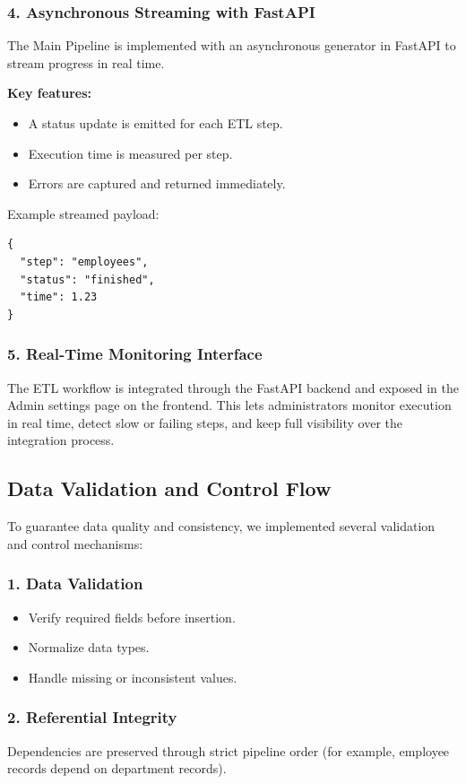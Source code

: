 \subsubsection*{4. Asynchronous Streaming with FastAPI}
The Main Pipeline is implemented with an asynchronous generator in FastAPI to stream progress in real time.

\textbf{Key features:}
\begin{itemize}[noitemsep]
    \item A status update is emitted for each ETL step.
    \item Execution time is measured per step.
    \item Errors are captured and returned immediately.
\end{itemize}

Example streamed payload:
\begin{verbatim}
{
  "step": "employees",
  "status": "finished",
  "time": 1.23
}
\end{verbatim}

\subsubsection*{5. Real-Time Monitoring Interface}
The ETL workflow is integrated through the FastAPI backend and exposed in the Admin settings page on the frontend. This lets administrators monitor execution in real time, detect slow or failing steps, and keep full visibility over the integration process.

\subsection{Data Validation and Control Flow}
To guarantee data quality and consistency, we implemented several validation and control mechanisms:

\subsubsection*{1. Data Validation}
\begin{itemize}[noitemsep]
    \item Verify required fields before insertion.
    \item Normalize data types.
    \item Handle missing or inconsistent values.
\end{itemize}

\subsubsection*{2. Referential Integrity}
Dependencies are preserved through strict pipeline order (for example, employee records depend on department records).

